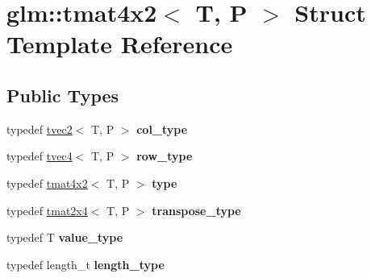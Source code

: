\hypertarget{structglm_1_1tmat4x2}{\section{glm\-:\-:tmat4x2$<$ T, P $>$ Struct Template Reference}
\label{structglm_1_1tmat4x2}
}
\subsection*{Public Types}
\begin{DoxyCompactItemize}
\item 
\hypertarget{structglm_1_1tmat4x2_ac775231a890f4ea29cd0073670309b3a}{typedef \hyperlink{structglm_1_1tvec2}{tvec2}$<$ T, P $>$ {\bfseries col\-\_\-type}}\label{structglm_1_1tmat4x2_ac775231a890f4ea29cd0073670309b3a}

\item 
\hypertarget{structglm_1_1tmat4x2_a3bef891d2ec9d87bc5ada0602ad3122f}{typedef \hyperlink{structglm_1_1tvec4}{tvec4}$<$ T, P $>$ {\bfseries row\-\_\-type}}\label{structglm_1_1tmat4x2_a3bef891d2ec9d87bc5ada0602ad3122f}

\item 
\hypertarget{structglm_1_1tmat4x2_a92c6e11d269f4f72087d8152689f16f1}{typedef \hyperlink{structglm_1_1tmat4x2}{tmat4x2}$<$ T, P $>$ {\bfseries type}}\label{structglm_1_1tmat4x2_a92c6e11d269f4f72087d8152689f16f1}

\item 
\hypertarget{structglm_1_1tmat4x2_a5eede582c47564806cff64584a24726c}{typedef \hyperlink{structglm_1_1tmat2x4}{tmat2x4}$<$ T, P $>$ {\bfseries transpose\-\_\-type}}\label{structglm_1_1tmat4x2_a5eede582c47564806cff64584a24726c}

\item 
\hypertarget{structglm_1_1tmat4x2_a1a84490287435bbc6746b250e03169f5}{typedef T {\bfseries value\-\_\-type}}\label{structglm_1_1tmat4x2_a1a84490287435bbc6746b250e03169f5}

\item 
\hypertarget{structglm_1_1tmat4x2_a28aaf36ee36edef6715c1fae6874f530}{typedef length\-\_\-t {\bfseries length\-\_\-type}}\label{structglm_1_1tmat4x2_a28aaf36ee36edef6715c1fae6874f530}

\end{DoxyCompactItemize}
